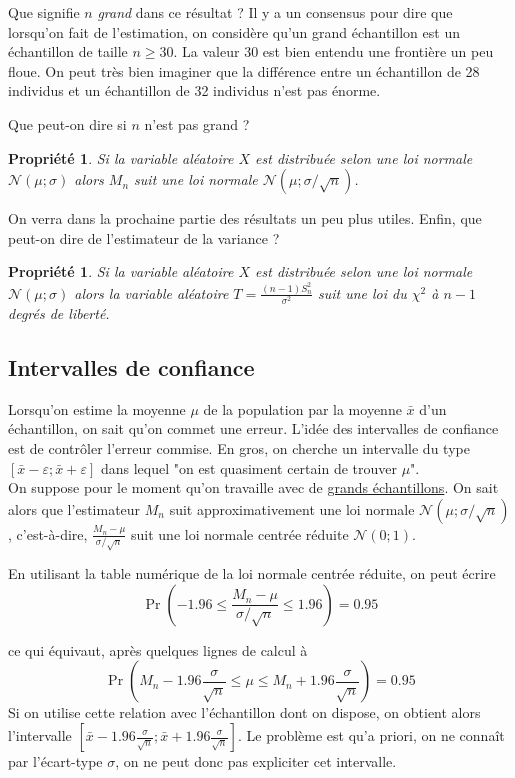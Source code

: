 \documentclass[12pt, a4paper]{book}
\newtheorem{prop}[thm]{Propriété}
\numberwithin{equation}{section}
\begin{document}
Que signifie $n$ {\it grand} dans ce résultat ? Il y a un consensus pour dire que lorsqu'on fait de l'estimation, 
on considère qu'un grand échantillon est un échantillon de taille $n\geq 30$. La valeur 30 est bien entendu une frontière un peu floue. On peut très bien imaginer que la différence entre un échantillon de 28 individus et un échantillon de 32 individus n'est pas énorme.

Que peut-on dire si $n$ n'est pas grand ?

\begin{prop}
Si la variable aléatoire $X$ est distribuée selon une loi normale $\mathcal{N}(\mu ; \sigma)$ alors 
$M_n$ suit  une loi normale $\mathcal{N}(\mu ; \sigma/\sqrt{n})$.
\end{prop}

On verra dans la prochaine partie des résultats un peu plus utiles. Enfin, que peut-on dire de l'estimateur
de la variance ?

\begin{prop}
Si la variable aléatoire $X$ est distribuée selon une loi normale $\mathcal{N}(\mu ; \sigma)$ alors 
la variable aléatoire $\displaystyle T=\frac{(n-1)S^2_n}{\sigma^2}$ suit une loi du $\chi^2$ à $n-1$
degrés de liberté.
\end{prop}


\subsection{Intervalles de confiance}


Lorsqu'on estime la moyenne $\mu$ de la population par la moyenne $\bar{x}$ d'un échantillon, on sait qu'on
commet une erreur. L'idée des intervalles de confiance est de contrôler l'erreur commise. En gros, on 
cherche un intervalle du type $[\bar{x} - \varepsilon ; \bar{x} + \varepsilon ]$ dans lequel "on est
quasiment certain de trouver $\mu$". \\

On suppose pour le moment qu'on travaille avec de \underline{grands échantillons}. On sait alors que l'estimateur $M_n$ suit 
approximativement une loi normale $\mathcal{N}(\mu;\sigma/\sqrt{n})$, c'est-à-dire, 
$\displaystyle \frac{M_n-\mu}{\sigma/\sqrt{n}}$ suit une loi normale centrée réduite $\mathcal{N}(0;1)$.

En utilisant la table numérique de la loi normale centrée réduite, on peut écrire
$$
\Pr\left(-1.96 \leq \frac{M_n-\mu}{\sigma/\sqrt{n}} \leq 1.96\right) = 0.95
$$

ce qui équivaut, après quelques lignes de calcul à 
$$
\Pr\left(M_n -1.96 \frac{\sigma}{\sqrt{n}} \leq \mu \leq M_n + 1.96 \frac{\sigma}{\sqrt{n}}\right) = 0.95
$$
Si on utilise cette relation avec l'échantillon dont on dispose, on obtient alors l'intervalle
$\displaystyle \left[\bar{x} - 1.96 \frac{\sigma}{\sqrt{n}} ; \bar{x} + 1.96 \frac{\sigma}{\sqrt{n}}\right]$. Le problème est qu'a priori, on
ne connaît par l'écart-type $\sigma$, on ne peut donc pas expliciter cet intervalle.
\end{document}
